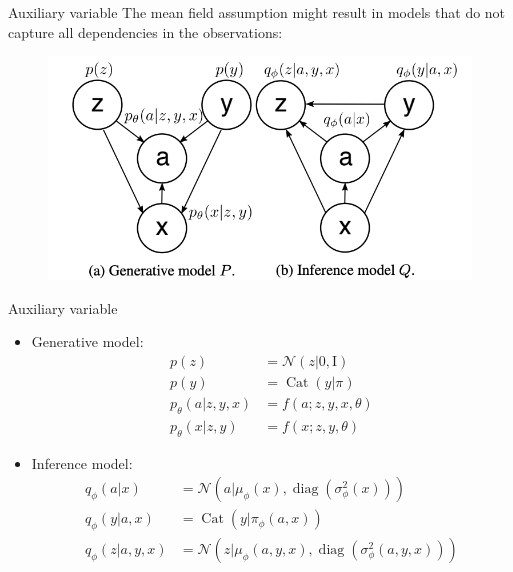 \begin{frame}{Auxiliary variable}
The mean field assumption might result in models that do not capture all dependencies in the observations:\\

\begin{figure}
\includegraphics[scale=0.45]{aux_variable2}
\end{figure}
\end{frame}

\begin{frame}{Auxiliary variable}
\begin{itemize}
\item Generative model: \\
\begin{equation}
\begin{aligned}
p(z) &=\mathcal{N}(z | 0, \mathrm{I}) \\ p(y) &=\operatorname{Cat}(y | \pi) \\ p_{\theta}(a | z, y, x) &=f(a ; z, y, x, \theta) \\ p_{\theta}(x | z, y) &=f(x ; z, y, \theta) 
\end{aligned}
\end{equation}
\item Inference model: \\
\begin{equation}
\begin{aligned}
 q_{\phi}(a | x) &=\mathcal{N}\left(a | \mu_{\phi}(x), \operatorname{diag}\left(\sigma_{\phi}^{2}(x)\right)\right) \\
  q_{\phi}(y | a, x) &=\operatorname{Cat}\left(y | \pi_{\phi}(a, x)\right) \\ 
  q_{\phi}(z | a, y, x) &=\mathcal{N}\left(z | \mu_{\phi}(a, y, x), \operatorname{diag}\left(\sigma_{\phi}^{2}(a, y, x)\right)\right) 
 \end{aligned}
\end{equation}
\end{itemize}
\end{frame}



